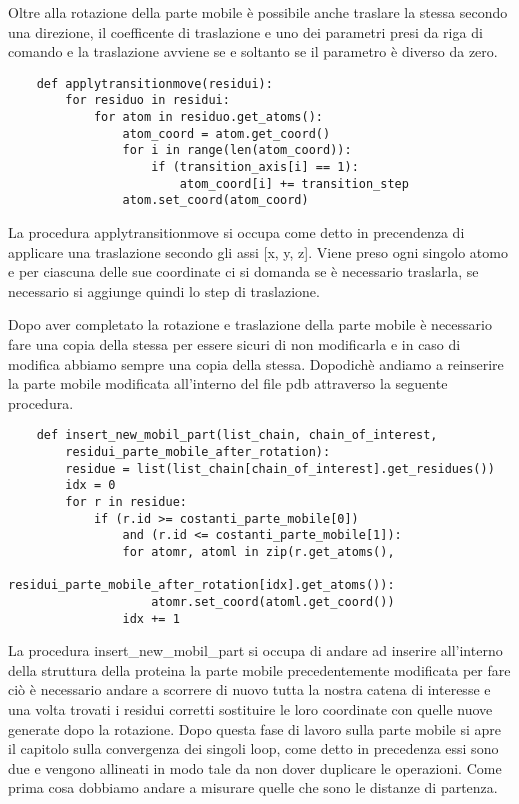 Oltre alla rotazione della parte mobile è possibile anche traslare la stessa secondo una direzione, il coefficente di traslazione e uno dei parametri presi da riga di 
comando e la traslazione avviene se e soltanto se il parametro è diverso da zero. 
\begin{verbatim}
    def applytransitionmove(residui):
        for residuo in residui:
            for atom in residuo.get_atoms():
                atom_coord = atom.get_coord()
                for i in range(len(atom_coord)):
                    if (transition_axis[i] == 1):
                        atom_coord[i] += transition_step
                atom.set_coord(atom_coord)
\end{verbatim}
La procedura applytransitionmove si occupa come detto in precendenza di applicare una traslazione secondo gli assi [x, y, z]. Viene preso ogni singolo atomo e per ciascuna
delle sue coordinate ci si domanda se è necessario traslarla, se necessario si aggiunge quindi lo step di traslazione. 

Dopo aver completato la rotazione e traslazione della parte mobile è necessario fare una copia della stessa per essere sicuri di non modificarla e in caso di modifica 
abbiamo sempre una copia della stessa. Dopodichè andiamo a reinserire la parte mobile modificata all'interno del file pdb attraverso la seguente procedura.

\begin{verbatim}
    def insert_new_mobil_part(list_chain, chain_of_interest, 
        residui_parte_mobile_after_rotation):
        residue = list(list_chain[chain_of_interest].get_residues())
        idx = 0
        for r in residue:
            if (r.id >= costanti_parte_mobile[0]) 
                and (r.id <= costanti_parte_mobile[1]):
                for atomr, atoml in zip(r.get_atoms(), 
                    residui_parte_mobile_after_rotation[idx].get_atoms()):
                    atomr.set_coord(atoml.get_coord())
                idx += 1
\end{verbatim}
La procedura insert\_new\_mobil\_part si occupa di andare ad inserire all'interno della struttura della proteina la parte mobile precedentemente modificata per fare ciò 
è necessario andare a scorrere di nuovo tutta la nostra catena di interesse e una volta trovati i residui corretti sostituire le loro coordinate con quelle nuove generate
dopo la rotazione. Dopo questa fase di lavoro sulla parte mobile si apre il capitolo sulla convergenza dei singoli loop, come detto in precedenza essi sono due e vengono
allineati in modo tale da non dover duplicare le operazioni. Come prima cosa dobbiamo andare a misurare quelle che sono le distanze di partenza.

